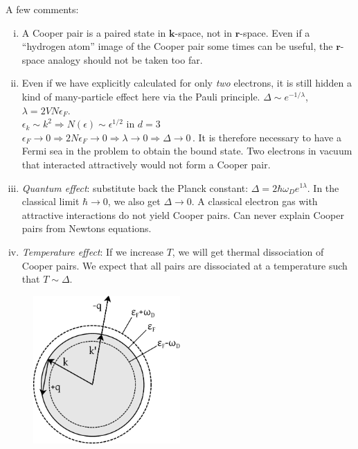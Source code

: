 A few comments:
\begin{enumerate}[(i)]
  \item A Cooper pair is a paired state in $\bm k$-space, not in $\bm r$-space.
        Even if a ``hydrogen atom'' image of the Cooper pair some times can be useful, the $\bm r$-space analogy should not be taken too far.
  \item Even if we have explicitly calculated for only \emph{two} electrons, it is still hidden a kind of many-particle effect here via the Pauli principle.
        $\Delta \sim e^{-1/\lambda}$, $\lambda = 2VN\epsilon_F$. \\
        $\epsilon_k \sim k^2 \Rightarrow N(\epsilon) \sim \epsilon^{1/2}$ in $d=3$\\
        $\epsilon_F \rightarrow 0 \Rightarrow 2N\epsilon_F \rightarrow 0 \Rightarrow \lambda \rightarrow 0 \Rightarrow \Delta \rightarrow 0$\,.
        It is therefore necessary to have a Fermi sea in the problem to obtain the bound state.
        Two electrons in vacuum that interacted attractively would not form a Cooper pair.
  \item \emph{Quantum effect}: substitute back the Planck constant: $\Delta = 2\hbar \omega_D e^{1\lambda}$. 
        In the classical limit $\hbar \rightarrow 0$, we also get $\Delta \rightarrow 0$.
        A classical electron gas with attractive interactions do not yield Cooper pairs.
        Can never explain Cooper pairs from Newtons equations.
  \item \emph{Temperature effect}: If we increase $T$, we will get thermal dissociation of Cooper pairs.
        We expect that all pairs are dissociated at a temperature such that $T \sim \Delta$.
\end{enumerate}



\clearpage
\begin{figure}[H]
  \centering
  \includegraphics[width=0.5\textwidth]{img/pp181-200_cooperlimits.pdf}
\end{figure}
